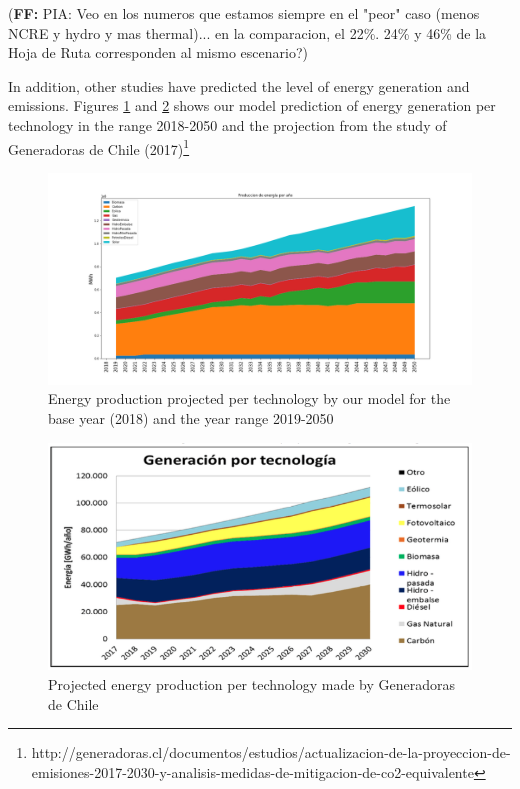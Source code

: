 \documentclass[11pt, letterpaper]{article}
\newcommand{\fel}[1]{{\color{red}({\bf FF:}#1)}}
\begin{document}
\fel{ PIA: Veo en los numeros que estamos siempre en el "peor" caso (menos NCRE y hydro y mas thermal)... en la comparacion, el 22\%. 24\% y 46\% de la Hoja de Ruta corresponden al mismo escenario?} 

In addition, other studies have predicted the level of energy generation and emissions. Figures \ref{fig:modelbau} and \ref{fig:gener} shows our model prediction of energy generation per technology in the range 2018-2050 and the projection from the study of Generadoras de Chile (2017)\footnote{http://generadoras.cl/documentos/estudios/actualizacion-de-la-proyeccion-de-emisiones-2017-2030-y-analisis-medidas-de-mitigacion-de-co2-equivalente}

\begin{figure}[ht!]
\begin{center}
\includegraphics[width=\textwidth]{Apuntes/produccion_per_year_sin_cnt.png}
\caption{Energy production projected per technology by our model for the base year (2018) and the year range 2019-2050} \label{fig:modelbau}   
\end{center}
\end{figure}

\begin{figure}[ht!]
\begin{center}
\includegraphics[width=13cm]{Apuntes/generadoras.png}
\caption{Projected energy production per technology made by Generadoras de Chile}
\label{fig:gener}
\end{center}
\end{figure}
\end{document}
